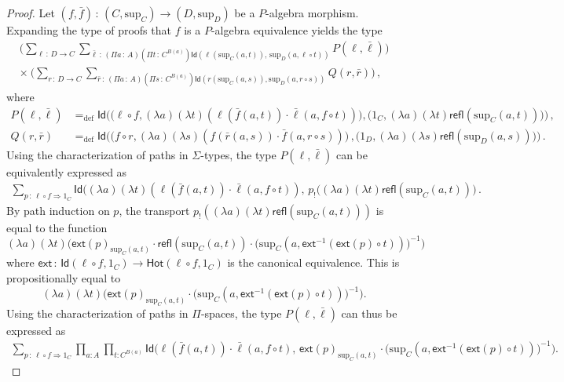 \documentclass[10pt,a4paper,oneside,reqno]{amsart}
\theoremstyle{mythm}
\theoremstyle{mydef}
\theoremstyle{myrmk}
\newcommand{\defeq}{=_{\mathrm{def}}}
\newcommand{\co}{\,{:}\,}
\newcommand{\com}{\circ}
\newcommand{\ct}{\cdot}
\newcommand{\Hot}{\mathsf{Hot}}
\newcommand{\ext}{\mathsf{ext}}
\newcommand{\Id}{\mathsf{Id}}
\newcommand{\refl}{\mathsf{refl}}
\renewcommand{\sup}{\mathrm{sup}}
\begin{document}
\begin{proof} Let $(f, \bar{f}) \co (C, \sup_C) \to (D, \sup_D)$ be a  $P$-algebra morphism. Expanding the type of proofs that $f$ is a 
$P$-algebra equivalence yields the type
\begin{multline*}
 \Big(
	 \sum_{\ell \co D \to C} \sum_{\bar{\ell} \co  (\Pi a \co A)( \Pi t \co C^{B(a)}) \Id( \ell (\sup_C(a,t)) ,\, \sup_D(a, \ell \circ t))}
 		P(\ell, \bar{\ell})
		\Big) \\
\times\ \Big(
	\sum_{r \co D \to C} \sum_{\bar{r} \co (\Pi a\co A) (\Pi s \co C^{B(a)}) \Id( r(\sup_C(a,s)), \sup_D(a, r \circ s))}
		Q(r, \bar{r})  
		\Big)\, , 
\end{multline*}
where
\begin{align*}
P(\ell,\bar{\ell}) & \defeq \Id \Big( \big( \ell \com f, (\lambda a)(\lambda t) (\ell(\bar{f}(a,t)) \ct \bar{\ell}(a, f \com t))\big), \big( 1_C, (\lambda a)(\lambda t) \refl(\sup_C(a,t))\big) \Big)  \, , \\
Q(r,\bar{r})    & \defeq \Id \Big( \big( f \com r, (\lambda a)(\lambda s) (f(\bar{r}(a,s)) \ct \bar{f}(a, r \com s))\big) \, , \big( 1_D, (\lambda a)(\lambda s) \refl(\sup_D(a,s)) \big) \Big) \, .
\end{align*}
Using the characterization of paths in $\Sigma$-types, the type $P(\ell,\bar{\ell})$ can be equivalently expressed as
\begin{align*}
\sum_{ p \co \ell \com f \Rightarrow 1{_C}} 
	\Id\big((\lambda a) (\lambda t) (\ell(\bar{f}(a,t)) \ct \bar{\ell}(a, f \com t)) ,\, p_{!}((\lambda a) (\lambda t) \refl(\sup_C(a,t)) \big) \,.
\end{align*}
By path induction on $p$, the transport $p_{!} ((\lambda a) (\lambda t) \refl(\sup_C(a,t)))$ is equal to the function
\[ (\lambda a) (\lambda t) \big( \ext(p)_{\sup_C(a,t)} \ct \refl(\sup_C(a,t)) \ct \big(\sup_C(a, \ext^{-1}(\ext(p) \circ t))\big)^{-1}\big) \]
where $\ext \co \Id(\ell \com f ,1_C ) \to \Hot(\ell \com f , 1_C )$ is the canonical equivalence. 
This is propositionally equal to
\[ (\lambda a)(\lambda t)\big( \ext(p)_{\sup_C(a,t)} \ct \big(\sup_C(a, \ext^{-1}(\ext(p) \circ t))\big)^{-1}\big) .\]
Using the characterization of paths in $\Pi$-spaces, the type $P(\ell,\bar{\ell})$ can thus be expressed as
\begin{align*}
\sum_{ p \co \ell \com f \Rightarrow 1{_C}} \prod_{a:A} \prod_{t: C^{B(a)}} 
	\Id\Big(\ell(\bar{f}(a,t)) \ct \bar{\ell}(a, f \com t),\, \ext(p)_{\sup_C(a,t)} \ct \big(\sup_C(a, \ext^{-1}(\ext(p) \circ t))\big)^{-1}\Big).

\end{align*}
\end{proof}
\end{document}
